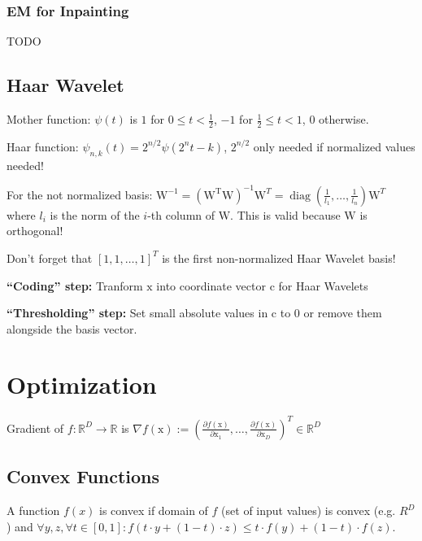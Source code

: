 \documentclass[a4paper, 11pt, landscape]{article}
\newcommand{\matr}[1]{\boldsymbol{\mathrm{#1}}}
\begin{document}
\begin{multicols*}{3}
\subsubsection{EM for Inpainting}
TODO

\subsection{Haar Wavelet}
\begin{compactdesc}
	\item[Mother function:] $\psi(t)$ is $1$ for $0 \leq t < \frac{1}{2}$, $-1$ for $\frac{1}{2} \leq t < 1$, $0$ otherwise.
	\item[Haar function:] $\psi_{n,k}(t) = 2^{n/2} \psi(2^n t - k)$, $2^{n/2}$ only needed if normalized values needed!
\end{compactdesc}

\begin{compactitem}
	\item For the not normalized basis: $\matr{W}^{-1} = (\matr{W^T} \matr{W})^{-1} \matr{W}^T = \operatorname{diag}(\frac{1}{l_1}, \ldots, \frac{1}{l_n}) \matr{W}^T$ where $l_i$ is the norm of the $i$-th column of $\matr{W}$. This is valid because $\matr{W}$ is orthogonal!
	\item Don't forget that $[1, 1, \ldots, 1]^T$ is the first non-normalized Haar Wavelet basis!
	\item \textbf{``Coding'' step:} Tranform $\matr{x}$ into coordinate vector $\matr{c}$ for Haar Wavelets
	\item \textbf{``Thresholding'' step:} Set small absolute values in $\matr{c}$ to $0$ or remove them alongside the basis vector.
\end{compactitem}

\section{Optimization}
Gradient of $f: \mathbb{R}^D \to \mathbb{R}$ is $\nabla f(\matr{x}) := \left( \frac{\partial f(\matr{x})}{\partial \matr{x}_1}, \ldots, \frac{\partial f(\matr{x})}{\partial \matr{x}_D} \right)^T \in \mathbb{R}^D$

\subsection{Convex Functions}
A function $f(x)$ is convex if domain of $f$ (set of input values) is convex (e.g. $R^D$) and $\forall y, z, \forall t \in [0, 1]: f(t \cdot y + (1-t) \cdot z) \leq t \cdot f(y) + (1-t) \cdot f(z)$.


\end{multicols*}
\end{document}
